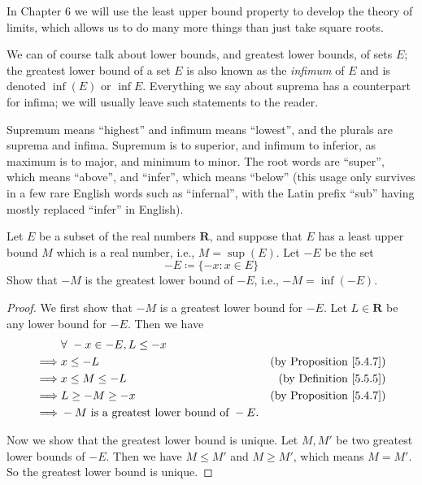 \begin{remark}\label{5.5.14}
    In Chapter 6 we will use the least upper bound property to develop the theory of limits, which allows us to do many more things than just take square roots.
\end{remark}

\begin{remark}\label{5.5.15}
    We can of course talk about lower bounds, and greatest lower bounds, of sets \(E\);
    the greatest lower bound of a set \(E\) is also known as the \emph{infimum} of \(E\) and is denoted \(\inf(E)\) or \(\inf E\).
    Everything we say about suprema has a counterpart for infima;
    we will usually leave such statements to the reader.
\end{remark}

\begin{note}
    Supremum means ``highest'' and infimum means ``lowest'', and the plurals are suprema and infima.
    Supremum is to superior, and infimum to inferior, as maximum is to major, and minimum to minor.
    The root words are ``super'', which means ``above'', and ``infer'', which means ``below''
    (this usage only survives in a few rare English words such as ``infernal'', with the Latin prefix ``sub'' having mostly replaced ``infer'' in English).
\end{note}

\exercisesection

\begin{exercise}\label{ex 5.5.1}
    Let \(E\) be a subset of the real numbers \(\mathbf{R}\), and suppose that \(E\) has a least upper bound \(M\) which is a real number, i.e., \(M = \sup(E)\).
    Let \(-E\) be the set
    \[
        -E \coloneqq \{-x : x \in E\}
    \]
    Show that \(-M\) is the greatest lower bound of \(-E\), i.e., \(-M = \inf(-E)\).
\end{exercise}

\begin{proof}
    We first show that \(-M\) is a greatest lower bound for \(-E\).
    Let \(L \in \mathbf{R}\) be any lower bound for \(-E\).
    Then we have
    \begin{align*}
                 & \forall\ -x \in -E, L \leq -x                                                      \\
        \implies & x \leq -L                                    & \text{(by Proposition \ref{5.4.7})} \\
        \implies & x \leq M \leq -L                             & \text{(by Definition \ref{5.5.5})}  \\
        \implies & L \geq -M \geq -x                            & \text{(by Proposition \ref{5.4.7})} \\
        \implies & -M \text{ is a greatest lower bound of } -E.
    \end{align*}

    Now we show that the greatest lower bound is unique.
    Let \(M, M'\) be two greatest lower bounds of \(-E\).
    Then we have \(M \leq M'\) and \(M \geq M'\), which means \(M = M'\).
    So the greatest lower bound is unique.
\end{proof}

